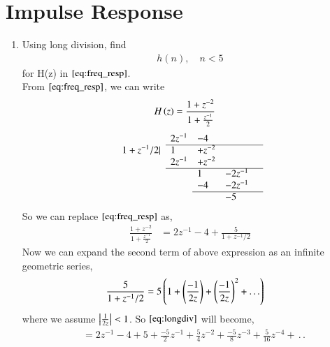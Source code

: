 \documentclass[journal,12pt,twocolumn]{IEEEtran}
\renewcommand\thesection{\arabic{section}}
\begin{document}
\section{Impulse Response}
\begin{enumerate}[label=\thesection.\arabic*]
     \item Using long division,
           find
           \begin{align}
                h(n), \quad n < 5
           \end{align}
           for H(z) in
           $\eqref{eq:freq_resp}$.\\
           \solution From $\eqref{eq:freq_resp}$, we can write
           \begin{align}
                H\left(z\right) & = \frac{1 + z^{-2}}{1 + \frac{z^{-1}}{2}}
           \end{align}
           $$
                \begin{array}{llllll}
                                    & 2z^{-1} & -4                   \\\cline{2-5}
                     1 + z^{-1}/2 | & 1       & +z^{-2}              \\
                                    & 2z^{-1} & +z^{-2}              \\\cline{2-5}
                                    &         & 1       & -2z^{-1}   \\
                                    &         & -4      & -2z^{-1} & \\\cline{3-5}
                                    &         &         & -5         \\
                \end{array}
           $$
           So we can replace $\eqref{eq:freq_resp}$ as,
           \begin{align}
                \frac{1+z^{-2}}{1 + \frac{z^{-1}}{2}} & = 2z^{-1} - 4 + \frac{5}{1 + z^{-1}/2}\label{eq:longdiv}
           \end{align}
           Now we can expand the second term of above expression as an infinite geometric series,
           \begin{align}
                \frac{5}{1+z^{-1}/2} &= 5\left(1 + \left(\frac{-1}{2z}\right) + \left(\frac{-1}{2z}\right)^2 + .\,.\,.\right) \end{align}
           where we assume $\left\vert\frac{1}{2z}\right\vert < 1$.
           So $\eqref{eq:longdiv}$ will become,
           \begin{align}
                 & = 2z^{-1} - 4 + 5 + \frac{-5}{2}z^{-1} + \frac{5}{4}z^{-2} + \frac{-5}{8}z^{-3} + \frac{5}{16}z^{-4} + \,.\,.              \\

\end{align}
\end{enumerate}
\end{document}
